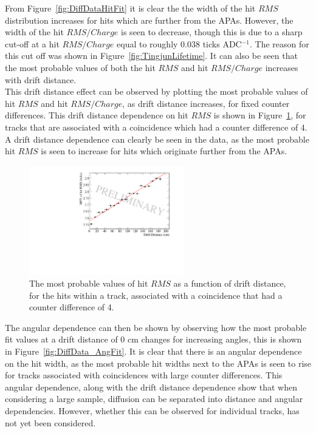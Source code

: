 From Figure~\ref{fig:DiffDataHitFit} it is clear the the width of the hit $RMS$ distribution increases for hits which are further from the APAs. However, the width of the hit $RMS/Charge$ is seen to decrease, though this is due to a sharp cut-off at a hit $RMS/Charge$ equal to roughly 0.038 ticks ADC$^{-1}$. The reason for this cut off was shown in Figure~\ref{fig:TingjunLifetime}. It can also be seen that the most probable values of both the hit $RMS$ and hit $RMS/Charge$ increases with drift distance. \\

This drift distance effect can be observed by plotting the most probable values of hit $RMS$ and hit $RMS/Charge$, as drift distance increases, for fixed counter differences. This drift distance dependence on hit $RMS$ is shown in Figure~\ref{fig:CDiff4DataFit}, for tracks that are associated with a coincidence which had a counter difference of 4. A drift distance dependence can clearly be seen in the data, as the most probable hit $RMS$ is seen to increase for hits which originate further from the APAs. \\

\begin{figure}[h!]
  \centering
  \includegraphics[width=0.6\textwidth]{CounterDiff4_Data}
  \caption[The drift distance dependence of diffusion in the 35 ton dataset for coincidences with a counter difference of 4]
          {The most probable values of hit $RMS$ as a function of drift distance, for the hits within a track, associated with a coincidence that had a counter difference of 4.}
  \label{fig:CDiff4DataFit}
\end{figure}

The angular dependence can then be shown by observing how the most probable fit values at a drift distance of 0 cm changes for increasing angles, this is shown in Figure~\ref{fig:DiffData_AngFit}. It is clear that there is an angular dependence on the hit width, as the most probable hit widths next to the APAs is seen to rise for tracks associated with coincidences with large counter differences. This angular dependence, along with the drift distance dependence show that when considering a large sample, diffusion can be separated into distance and angular dependencies. However, whether this can be observed for individual tracks, has not yet been considered. \\

